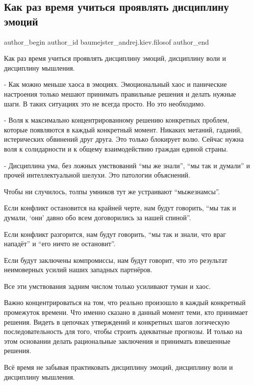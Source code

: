  
 
 
 
 
 
\subsection{Как раз время учиться проявлять дисциплину эмоций}
\label{sec:19_02_2022.fb.baumejster_andrej.kiev.filosof.1.disciplina_emocij}
 
\ifcmt
 author_begin
   author_id baumejster_andrej.kiev.filosof
 author_end
\fi

Как раз время учиться проявлять дисциплину эмоций, дисциплину воли и дисциплину
мышления.

- Как можно меньше хаоса в эмоциях. Эмоциональный хаос и панические настроения
только мешают принимать правильные решения и делать нужные шаги. В таких
ситуациях это не всегда просто. Но это необходимо. 

- Воля к максимально концентрированному решению конкретных проблем, которые
появляются в каждый конкретный момент. Никаких метаний, гаданий, истерических
обвинений друг друга. Это только блокирует волю. Сейчас нужна воля к
солидарности и к общему взаимодействию граждан единой страны. 

- Дисциплина ума, без ложных умствований \enquote{мы же знали}, \enquote{мы так и думали} и
прочей интеллектуальной шелухи. Это патологии объяснений.

Чтобы ни случилось, толпы умников тут же устраивают \enquote{мыжезнамсы}.

Если конфликт остановится на крайней черте, нам будут говорить, \enquote{мы так и
думали, \enquote{они} давно обо всем договорились за нашей спиной}.

Если конфликт разгорится, нам будут говорить, \enquote{мы так и знали, что враг
нападёт} и \enquote{его ничто не остановит}. 

Если будут заключены компромиссы, нам будут говорит, что это результат
неимоверных усилий наших западных партнёров.

Все эти умствования задним числом только усиливают туман и хаос.

Важно концентрироваться на том, что реально произошло в каждый конкретный
промежуток времени. Что именно сказано в данный момент теми, кто принимает
решения. Видеть в цепочках утверждений и конкретных шагов логическую
последовательность для того, чтобы строить адекватные прогнозы. И только на
этом основании делать рациональные заключения и принимать взвешенные решения.

Всё время не забывая практиковать дисциплину эмоций, дисциплину воли и
дисциплину мышления.
